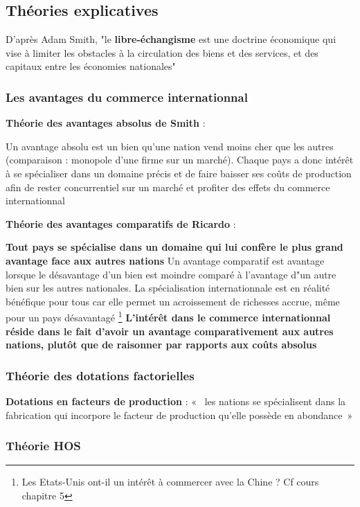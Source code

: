 \subsection{Théories explicatives}
D'après Adam Smith, "le \textbf{libre-échangisme} est une doctrine économique qui vise à limiter les obstacles à la circulation des biens et des services, et des capitaux entre les économies nationales" \newline
\subsubsection{Les avantages du commerce internationnal}
\large{
\textbf{Théorie des avantages absolus de Smith} : \newline

Un avantage absolu est un bien qu'une nation vend moins cher que les autres (comparaison : monopole d'une firme sur un marché). 
Chaque pays a donc intérêt à se spécialiser dans un domaine précis et de faire baisser ses coûts de production afin de rester concurrentiel sur un marché et profiter des effets du commerce internationnal \newline

\textbf{Théorie des avantages comparatifs de Ricardo} :\newline


\textbf{Tout pays se spécialise dans un domaine qui lui confère le plus grand avantage face aux autres nations}
Un avantage comparatif est avantage lorsque le désavantage d'un bien est moindre comparé à l'avantage d"un autre bien sur les autres nationales. 
La spécialisation internationnale est en réalité bénéfique pour tous car elle permet un acroissement de richesses accrue, même pour un pays désavantagé \footnote{Les Etats-Unis ont-il un intérêt à commercer avec la Chine ? Cf cours chapitre 5 } \newline
\textbf{L'intérêt dans le commerce internationnal réside dans le fait d'avoir un avantage comparativement aux autres nations, plutôt que de raisonner par rapports aux coûts absolus}
}
\newpage
\subsubsection{Théorie des dotations factorielles}
\Large{
\textbf{Dotations en facteurs de production} : «  les nations se spécialisent dans la fabrication qui incorpore le facteur de production qu’elle possède en abondance »
}
\subsubsection{Théorie HOS}

